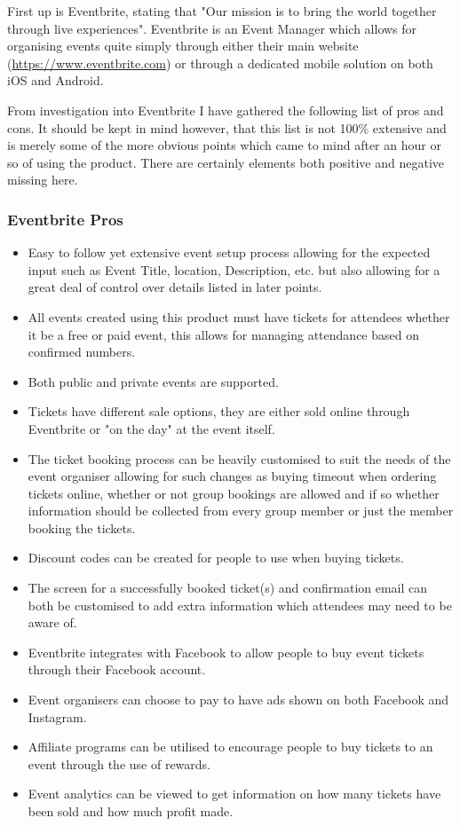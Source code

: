 First up is Eventbrite, stating that "Our mission is to bring the world together through live experiences"\cite{eventbritemissionstatement}. Eventbrite is an Event Manager which allows for organising events quite simply through either their main website (\url{https://www.eventbrite.com}) or through a dedicated mobile solution on both iOS\cite{eventbriteorganiseriosapp} and Android\cite{eventbriteorganiserandroidapp}.

From investigation into Eventbrite I have gathered the following list of pros and cons. It should be kept in mind however, that this list is not 100\% extensive and is merely some of the more obvious points which came to mind after an hour or so of using the product. There are certainly elements both positive and negative missing here.

\subsubsection{Eventbrite Pros}

\begin{itemize}
    \item Easy to follow yet extensive event setup process allowing for the expected input such as Event Title, location, Description, etc. but also allowing for a great deal of control over details listed in later points.
    \item All events created using this product must have tickets for attendees whether it be a free or paid event, this allows for managing attendance based on confirmed numbers.
    \item Both public and private events are supported.
    \item Tickets have different sale options, they are either sold online through Eventbrite or "on the day" at the event itself.
    \item The ticket booking process can be heavily customised to suit the needs of the event organiser allowing for such changes as buying timeout when ordering tickets online, whether or not group bookings are allowed and if so whether information should be collected from every group member or just the member booking the tickets.
    \item Discount codes can be created for people to use when buying tickets.
    \item The screen for a successfully booked ticket(s) and confirmation email can both be customised to add extra information which attendees may need to be aware of.
    \item Eventbrite integrates with Facebook to allow people to buy event tickets through their Facebook account.
    \item Event organisers can choose to pay to have ads shown on both Facebook and Instagram.
    \item Affiliate programs can be utilised to encourage people to buy tickets to an event through the use of rewards.
    \item Event analytics can be viewed to get information on how many tickets have been sold and how much profit made.
\end{itemize}

